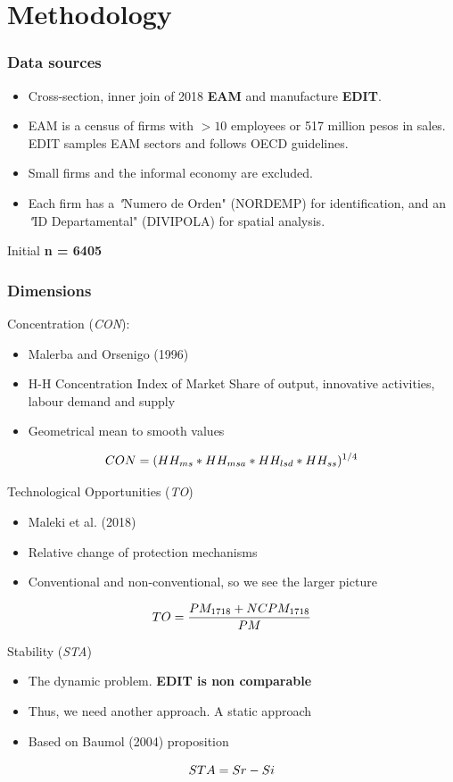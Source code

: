 \documentclass{beamer}
\begin{document}
\section{Methodology}
	 \begin{frame}
	 	\frametitle{Data sources}
	 	\begin{itemize}
	 		\item Cross-section, inner join of 2018 \textbf{EAM} and manufacture \textbf{EDIT}. 
	 		\item EAM is a census of firms with $>10$ employees or 517 million pesos in sales. EDIT samples EAM sectors and follows OECD guidelines.
	 		\item Small firms and the informal economy are excluded.
	 		\item Each firm has a \textit"{Numero de Orden}" (NORDEMP) for identification, and an \textit"{ID Departamental}" (DIVIPOLA) for spatial analysis.
	 	\end{itemize}
 	Initial \textbf{n = 6405}
	 \end{frame}
     \begin{frame}[allowframebreaks]
     	\frametitle{Dimensions}
     	Concentration (\textit{CON}):
     	\begin{itemize}
     		\item Malerba and Orsenigo (1996)
     		\item H-H Concentration Index of Market Share of output, innovative activities, labour demand and supply
     		\item Geometrical mean to smooth values
     	\end{itemize} 
     	\begin{equation}
     		\centering
     		CON = (HH_{ms}*HH_{msa}*HH_{lsd}*HH_{ss})^{1/4}
     	\end{equation}
     \framebreak
     
     Technological Opportunities (\textit{TO})
     \begin{itemize}
     	\item Maleki et al. (2018)
     	\item Relative change of protection mechanisms 
     	\item Conventional and non-conventional, so we see the larger picture
     \end{itemize}
 	 \begin{equation}
 	 \centering
 	 TO = \dfrac{PM_{1718} + NCPM_{1718}}{PM}
 	 \end{equation}
  	\framebreak
  	
  	Stability (\textit{STA})
  	\begin{itemize}
  		\item The dynamic problem.\textbf{ EDIT is non comparable}
  		\item Thus, we need another approach. A static approach
  		\item Based on Baumol (2004) proposition
  	\end{itemize}
  		\begin{equation}
  		\centering
  		STA = Sr - Si
  		\end{equation}
\end{frame}
\end{document}
